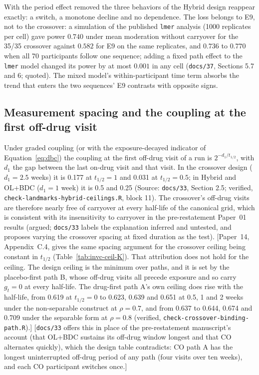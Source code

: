 \documentclass[11pt]{article}
\newcommand{\note}[1]{\textcolor{blue!60!black}{\small [#1]}}
\newcommand{\code}[1]{\texttt{#1}}
\begin{document}
With the period effect removed the three behaviors of the Hybrid design
reappear exactly: a switch, a monotone decline and no dependence. The
loss belongs to E9, not to the crossover: a simulation of the published
\code{lmer} analysis (1000 replicates per cell) gave power $0.740$
under mean moderation without carryover for the 35/35 crossover against
$0.582$ for E9 on the same replicates, and $0.736$ to $0.770$ when all
70 participants follow one sequence; adding a fixed path effect to the
\code{lmer} model changed its power by at most $0.001$ in any cell
(\code{docs/37}, Sections 5.7 and 6; quoted). The mixed model's
within-participant time term absorbs the trend that enters the two
sequences' E9 contrasts with opposite signs.

\subsection{Measurement spacing and the coupling at the first off-drug
visit}
\label{sec:invc-spacing}

Under graded coupling (or with the exposure-decayed indicator of
Equation~\eqref{eq:dbc}) the coupling at the first off-drug visit of a
run is $2^{-d_1/t_{1/2}}$, with $d_1$ the gap between the last on-drug
visit and that visit. In the crossover design ($d_1 = 2.5$ weeks) it is
0.177 at $t_{1/2} = 1$ and 0.031 at $t_{1/2} = 0.5$; in Hybrid and
OL+BDC ($d_1 = 1$ week) it is 0.5 and 0.25 (Source: \code{docs/33},
Section 2.5; verified, \code{check-landmarks-hybrid-ceilings.R}, block 11). The
crossover's off-drug visits are therefore nearly free of carryover at
every half-life of the canonical grid, which is consistent with its
insensitivity to carryover in the pre-restatement Paper~01 results
(argued; \code{docs/33} labels the explanation inferred and untested,
and proposes varying the crossover spacing at fixed duration as the
test). \note{Paper~14, Appendix~C.4, gives the same spacing argument for
the crossover ceiling being constant in $t_{1/2}$
(Table~\ref{tab:invc-ceil-K}). That attribution does not hold for the
ceiling. The design ceiling is the minimum over paths, and it is set by
the placebo-first path B, whose off-drug visits all precede exposure
and so carry $g_t = 0$ at every half-life. The drug-first path A's own
ceiling does rise with the half-life, from 0.619 at $t_{1/2} = 0$ to
0.623, 0.639 and 0.651 at 0.5, 1 and 2 weeks under the non-separable
construct at $\rho = 0.7$, and from 0.637 to 0.644, 0.674 and 0.709
under the separable form at $\rho = 0.8$ (verified,
\code{check-crossover-binding-path.R}).} \note{\code{docs/33} offers
this in place of the pre-restatement manuscript's account (that
OL+BDC sustains its off-drug window longest and that CO alternates
quickly), which the design table contradicts: CO path A has the
longest uninterrupted off-drug period of any path (four visits over
ten weeks), and each CO participant switches once.}
\end{document}
